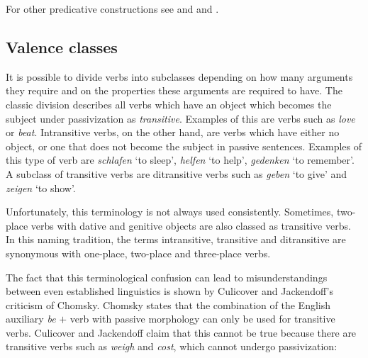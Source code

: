 For other predicative constructions see  and 
and .


\subsection{Valence classes}

\addlines[2]
It is possible to divide verbs into subclasses depending on how many arguments they require and on the properties these arguments are required to have. The
classic division describes all verbs which have an object which becomes the subject under passivization as \emph{transitive}. Examples of this
are verbs such as \emph{love} or \emph{beat}. Intransitive verbs, on the other hand, are verbs which have either no object, or one that does not become the subject in passive
sentences. Examples of this type of verb are \emph{schlafen} `to sleep', \emph{helfen} `to help', \emph{gedenken} `to remember'. A subclass of transitive verbs are 
ditransitive verbs such as \emph{geben} `to give' and \emph{zeigen} `to show'.

Unfortunately, this terminology is not always used consistently. Sometimes, two-place verbs with
dative and genitive objects are also classed as transitive verbs. In this naming tradition, the
terms intransitive, transitive and ditransitive are synonymous with one-place, two-place and
three-place verbs.

The fact that this terminological confusion can lead to misunderstandings between even established linguistics is shown by Culicover and Jackendoff's \citeyearpar[]{CJ2005a} criticism 
of Chomsky. Chomsky states that the combination of the English auxiliary \emph{be} $+$ verb with passive morphology can only be used for transitive verbs. Culicover and Jackendoff claim that this cannot
be true because there are transitive verbs such as \emph{weigh} and \emph{cost}, which cannot undergo passivization:
\eal
{}
\zl

